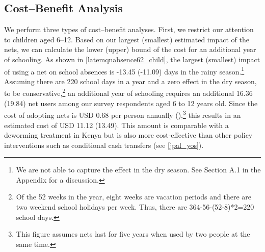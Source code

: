 \documentclass[fleqn,11pt]{article}
\begin{document}





\subsection{Cost--Benefit Analysis}

We perform three types of cost--benefit analyses. First, we restrict our attention to children aged 6--12. Based on our largest (smallest) estimated impact of the nets, we can calculate the lower (upper) bound of the cost for an additional year of schooling. As shown in \autoref{latemqnabsence62_child}, the largest (smallest) impact of using a net on school absences is -13.45  (-11.09)  days in the rainy season.\footnote{We are not able to capture the effect in the dry season. See Section A.1 in the Appendix for a discussion. } Assuming there are 220 school days in a year and a zero effect in the dry season, to be conservative,\footnote{Of the 52 weeks in the year, eight weeks are vacation periods and there are two weekend school holidays per week. Thus, there are 364-56-(52-8)*2=220 school days.} an additional year of schooling requires an additional 16.36 (19.84) net users among our survey respondents aged 6 to 12 years old. Since the cost of adopting nets is USD 0.68 per person annually (\cite%
{sumitomo-chemical_olyset_2010}),\footnote{This figure assumes nets last for five years when used by two people at the same time.} this results in an estimated cost of USD 11.12 (13.49). This amount is comparable with a deworming treatment in Kenya \citep{miguel_worms:_2004,the_abdul_latif_jameel_poverty_action_lab_roll_2017} but is also more cost-effective than other policy interventions such as conditional cash transfers (see \autoref{jpal_yos}).
\end{document}
